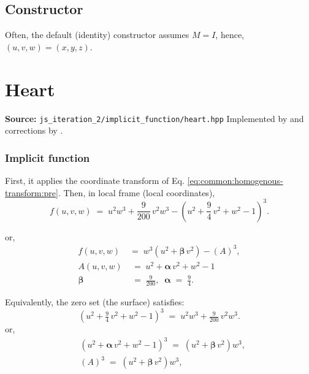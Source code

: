 \documentclass{article}
\begin{document}
\subsection{Constructor}
Often,
the default (identity) constructor
assumes $M=I$, hence, $(u,v,w) = (x,y,z)$.

\pagebreak
\section{Heart}

\textbf{Source:}
\texttt{js\_iteration\_2/implicit\_function/heart.hpp}
\noindent Implemented by \cite{schauvier:800358f}
and corrections by \cite{m.karotsieris:9af5c56}.


\subsubsection{Implicit function}
First, it applies the coordinate transform
of Eq. \ref{eq:common:homogenous-transform:pre}.
Then, in local frame (local coordinates),
\begin{equation}
  f(u,v,w)
  \;=\;
  u^2 w^3
  + \frac{9}{200}\,v^2 w^3
  - \left(u^2 + \frac{9}{4}\,v^2 + w^2 - 1\right)^3 .
\end{equation}

or,
\begin{align}
  f(u,v,w)
  \;&=\;
   w^3 (
    u^2 + \bm\beta\,v^2 )
  - \left( A \right)^3 ,
  \\
  A(u,v,w) &\;=\; u^2 + \bm\alpha\,v^2 + w^2 - 1
  \\
  \bm\beta &\;=\; \tfrac{9}{200} ,
  \;\;
  \bm\alpha \;=\; \tfrac{9}{4} .
\end{align}

Equivalently,
the zero set (the surface) satisfies:
\begin{equation}
  \left(u^2 + \tfrac{9}{4}\,v^2 + w^2 - 1\right)^3
  \;=\;
  u^2 w^3 + \tfrac{9}{200}\,v^2 w^3 .
\end{equation}
or,
\begin{align}
  &
  \left(u^2 + \bm\alpha\,v^2 + w^2 - 1\right)^3
  \;=\;
  ( u^2 + \bm\beta\,v^2 ) w^3 ,
  \\
  &
  \left(A\right)^3
  \;=\;
  ( u^2 + \bm\beta\,v^2 ) w^3 ,
\end{align}
\end{document}
